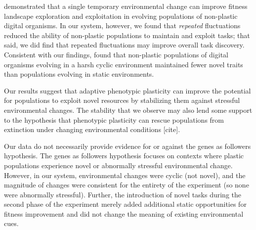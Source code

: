 \cite{nahum_improved_2017} demonstrated that a single temporary environmental change can improve fitness landscape exploration and exploitation in evolving populations of non-plastic digital organisms.
In our system, however, we found that \textit{repeated} fluctuations reduced the ability of non-plastic populations to maintain and exploit tasks; that said, we did find that repeated fluctuations may improve overall task discovery. 
Consistent with our findings, \cite{canino-koning_fluctuating_2019} found that non-plastic populations of digital organisms evolving in a harsh cyclic environment maintained fewer novel traits than populations evolving in static environments.

Our results suggest that adaptive phenotypic plasticity can improve the potential for populations to exploit novel resources by stabilizing them against stressful environmental changes.
The stability that we observe may also lend some support to the hypothesis that phenotypic plasticity can rescue populations from extinction under changing environmental conditions [cite].

Our data do not necessarily provide evidence for or against the genes as followers hypothesis.
The genes as followers hypothesis focuses on contexts where plastic populations experience novel or abnormally stressful environmental change.
However, in our system, environmental changes were cyclic (not novel), and the magnitude of changes were consistent for the entirety of the experiment (so none were abnormally stressful).
Further, the introduction of novel tasks during the second phase of the experiment merely added additional static opportunities for fitness improvement and did not change the meaning of existing environmental cues. %

